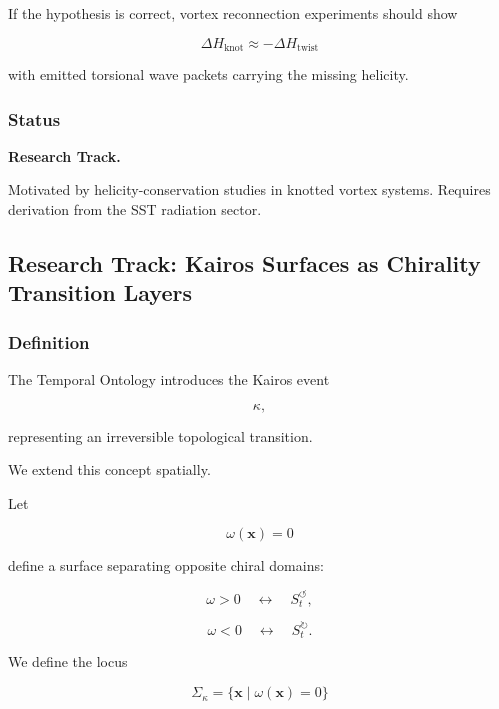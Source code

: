         If the hypothesis is correct, vortex reconnection experiments should show
        
        \[
            \Delta H_{\mathrm{knot}}
            \approx
            -
            \Delta H_{\mathrm{twist}}
        \]
        
        with emitted torsional wave packets carrying the missing helicity.
    
    \subsubsection{Status}
        
        \textbf{Research Track.}
        
        Motivated by helicity-conservation studies in knotted vortex systems.
        Requires derivation from the SST radiation sector.
    
    
\subsection{Research Track: Kairos Surfaces as Chirality Transition Layers}
    
    \subsubsection{Definition}
        
        The Temporal Ontology introduces the Kairos event
        
        \[
            \kappa,
        \]
        
        representing an irreversible topological transition.
        
        We extend this concept spatially.
        
        Let
        
        \[
            \omega(\mathbf{x})=0
        \]
        
        define a surface separating opposite chiral domains:
        
        \[
            \omega>0
            \quad\leftrightarrow\quad
            S_t^{\circlearrowleft},
        \]
        
        \[
            \omega<0
            \quad\leftrightarrow\quad
            S_t^{\circlearrowright}.
        \]
        
        We define the locus
        
        \[
            \Sigma_\kappa
            =
            \{
            \mathbf{x}
            \;|\;
            \omega(\mathbf{x})=0
            \}
        \]
        
